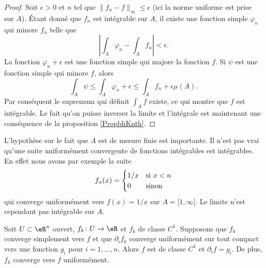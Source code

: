 \begin{proof}
    Soit \( \epsilon>0\) et \( n\) tel que \( \| f_n-f \|_{\infty}\leq \epsilon\) (ici la norme uniforme est prise sur \( A\)). Étant donné que \( f_n\) est intégrable sur \( A\), il existe une fonction simple \( \varphi_n\) qui minore \( f_n\) telle que
    \begin{equation}
        \left| \int_{A}\varphi_n-\int_A f_n \right| <\epsilon.
    \end{equation}
    La fonction \( \varphi_n+\epsilon\) est une fonction simple qui majore la fonction \( f\). Si \( \psi\) est une fonction simple qui minore \( f\), alors
    \begin{equation}
        \int_A\psi\leq\int_A\varphi_n+\epsilon\leq\int_A f_n+\epsilon\mu(A).
    \end{equation}
    Par conséquent le supremum qui définit \( \int_A f\) existe, ce qui montre que \( f\) est intégrable. Le fait qu'on puisse inverser la limite et l'intégrale est maintenant une conséquence de la proposition \ref{PropbhKnth}.
\end{proof}

\begin{remark}
    L'hypothèse sur le fait que \( A\) est de mesure finie est importante. Il n'est pas vrai qu'une suite uniformément convergente de fonctions intégrables est intégrables. En effet nous avons par exemple la suite
    \begin{equation}
        f_n(x)=\begin{cases}
            1/x    &   \text{si \( x<n\)}\\
            0    &    \text{sinon}
        \end{cases}
    \end{equation}
    qui converge uniformément vers \( f(x)=1/x\) sur \( A=\mathopen[ 1 , \infty [\). Le limite n'est cependant pas intégrable sur \( A\).
\end{remark}

\begin{theorem}		\label{ThoSerUnifDerr}
	Soit $U\subset\eR^n$ ouvert, $f_k\colon U\to \eR$ et $f_k$ de classe $C^1$. Supposons que $f_k$ converge simplement vers $f$ et que $\partial_if_k$ converge uniformément sur tout compact  vers une fonction $g_i$ pour $i=1,\ldots,n$. Alors $f$ est de classe $C^1$ et $\partial_if=g_i$. De plus, $f_k$ converge vers $f$ uniformément.
\end{theorem}

